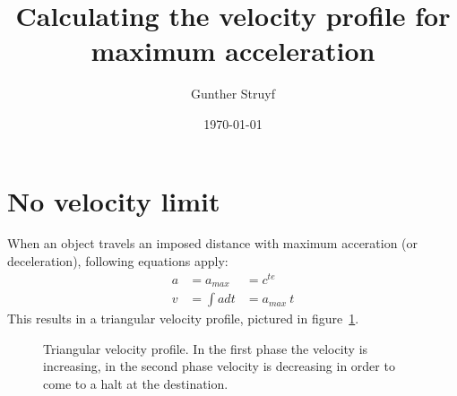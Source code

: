 \documentclass{article}
\title{Calculating the velocity profile for maximum acceleration}
\author{Gunther Struyf}
\date{\today}
\begin{document}
\maketitle

\section{No velocity limit\label{sec:nolimit}}
	When an object travels an imposed distance with maximum acceration (or deceleration), following equations apply:
	\begin{eqnarray}
		a &= a_{max}	&= c^{te}\\
		v &= \int a dt	&= a_{max}\ t
	\end{eqnarray}
	This results in a triangular velocity profile, pictured in figure~\ref{fig:triangular_vel_profile}.\\
	\begin{figure}[ht!]
		\centering
		\caption{Triangular velocity profile. In the first phase the velocity is increasing, in the second phase velocity is decreasing in order to come to a halt at the destination.}
		\label{fig:triangular_vel_profile}
	\end{figure}
	
\end{document}
